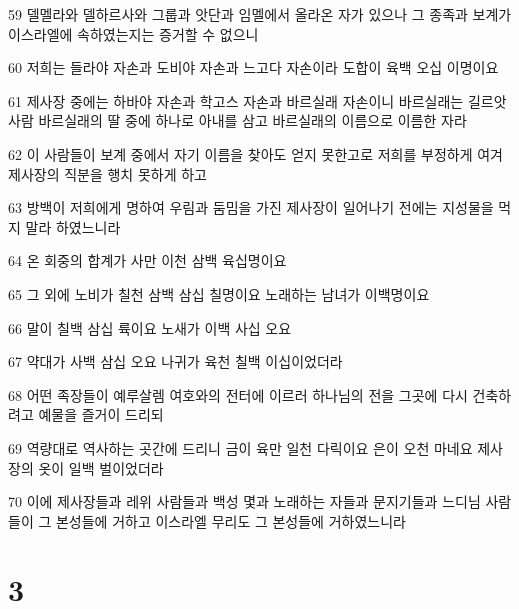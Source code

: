 \par 59 델멜라와 델하르사와 그룹과 앗단과 임멜에서 올라온 자가 있으나 그 종족과 보계가 이스라엘에 속하였는지는 증거할 수 없으니
\par 60 저희는 들라야 자손과 도비야 자손과 느고다 자손이라 도합이 육백 오십 이명이요
\par 61 제사장 중에는 하바야 자손과 학고스 자손과 바르실래 자손이니 바르실래는 길르앗 사람 바르실래의 딸 중에 하나로 아내를 삼고 바르실래의 이름으로 이름한 자라
\par 62 이 사람들이 보계 중에서 자기 이름을 찾아도 얻지 못한고로 저희를 부정하게 여겨 제사장의 직분을 행치 못하게 하고
\par 63 방백이 저희에게 명하여 우림과 둠밈을 가진 제사장이 일어나기 전에는 지성물을 먹지 말라 하였느니라
\par 64 온 회중의 합계가 사만 이천 삼백 육십명이요
\par 65 그 외에 노비가 칠천 삼백 삼십 칠명이요 노래하는 남녀가 이백명이요
\par 66 말이 칠백 삼십 륙이요 노새가 이백 사십 오요
\par 67 약대가 사백 삼십 오요 나귀가 육천 칠백 이십이었더라
\par 68 어떤 족장들이 예루살렘 여호와의 전터에 이르러 하나님의 전을 그곳에 다시 건축하려고 예물을 즐거이 드리되
\par 69 역량대로 역사하는 곳간에 드리니 금이 육만 일천 다릭이요 은이 오천 마네요 제사장의 옷이 일백 벌이었더라
\par 70 이에 제사장들과 레위 사람들과 백성 몇과 노래하는 자들과 문지기들과 느디님 사람들이 그 본성들에 거하고 이스라엘 무리도 그 본성들에 거하였느니라

\chapter{3}

